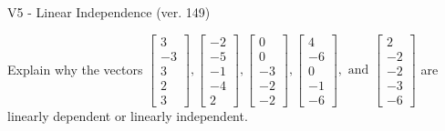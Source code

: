 \begin{exercise}
  \begin{exerciseTitle}V5 - Linear Independence (ver. 149)\end{exerciseTitle}
  \begin{exerciseStatement}
    Explain why the vectors \(\left[\begin{array}{r}
3 \\
-3 \\
3 \\
2 \\
3
\end{array}\right] , \left[\begin{array}{r}
-2 \\
-5 \\
-1 \\
-4 \\
2
\end{array}\right] , \left[\begin{array}{r}
0 \\
0 \\
-3 \\
-2 \\
-2
\end{array}\right] , \left[\begin{array}{r}
4 \\
-6 \\
0 \\
-1 \\
-6
\end{array}\right] , \text{ and } \left[\begin{array}{r}
2 \\
-2 \\
-2 \\
-3 \\
-6
\end{array}\right]\) are linearly dependent or linearly independent.	



\end{exerciseStatement}
\end{exercise}
